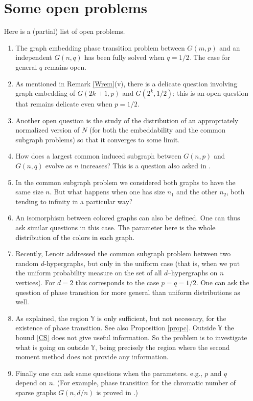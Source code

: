 \documentclass[reqno]{amsart}
\theoremstyle{theorem}
\theoremstyle{definition}
\theoremstyle{remark}
\newcommand{\1}{{\text{\Large $\mathfrak 1$}}}	%
\numberwithin{equation}{section}
\def\Y{\mathbb{Y}}
\begin{document}
\section{\bfseries Some open problems}
Here is a (partial) list of open problems.
\begin{enumerate}[P1.]
\item
The graph embedding phase transition problem between
$G(m,p)$ and an independent $G(n,q)$ has been fully solved
when $q=1/2$. The case for general $q$ remains open.

\item
As mentioned in Remark \ref{Wrem}(v), there is a delicate question involving
graph embedding of $G(2k+1,p)$ and $G(2^k, 1/2)$; this is an open question
that remains delicate even when $p=1/2$.


\item
Another open question is the study of the distribution of an appropriately
normalized version of $N$ 
(for both the embeddability and the common subgraph problems)
so that it converges to some limit.

\item
How does a largest common induced subgraph between $G(n,p)$ and $G(n,q)$
evolve as $n$ increases? This is a question also asked in \cite{ChD23}.

\item
In the common subgraph problem we considered both graphs to
have the same size $n$. But what happens when one has size $n_1$ and
the other $n_2$, both tending to infinity in a particular way?

\item
An isomorphism between colored graphs can also be defined. One
can thus ask similar questions in this case. The parameter here 
is the whole distribution of the colors in each graph.

\item
Recently, Lenoir \cite{L2024} addressed the common subgraph
problem between two random $d$-hypergraphs, but only
in the uniform case (that is, when we put the uniform
probability measure on the set of all $d$--hypergraphs on $n$ vertices).
For $d=2$ this corresponds to the case $p=q=1/2$. 
One can ask the question of phase transition for more general
than uniform distributions as well.

\item
\label{outside}
As explained, the region $\Y$ is only sufficient, but not necessary,
for the existence of phase transition.
See also Proposition \ref{propc}.
Outside $\Y$ the bound \eqref{CS} does not give useful information.
So the problem is to investigate what is going on outside $\Y$,
being precisely the region where the second moment method does
not provide any information.

\item
Finally one can ask same questions when the parameters. e.g.,
$p$ and $q$ depend on $n$. (For example, phase transition
for the chromatic number of sparse graphs $G(n,d/n)$ is proved in
\cite{AN2005}.)
\end{enumerate}
\end{document}
